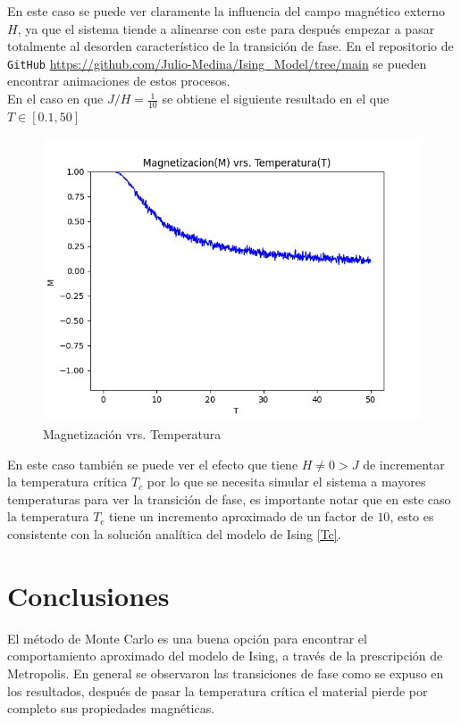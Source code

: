 \documentclass[a4paper]{article}
\begin{document}
En este caso se puede ver claramente la influencia del campo magnético externo $H$, ya que el sistema tiende a alinearse con este para después empezar a pasar totalmente al desorden característico de la transición de fase. En el repositorio de \texttt{GitHub} \url{https://github.com/Julio-Medina/Ising_Model/tree/main} se pueden encontrar animaciones de estos procesos.\\

En el caso en que $J/H=\frac{1}{10}$ se obtiene el siguiente resultado en el que $T\in[0.1,50]$ 
\begin{figure}[H]
\begin{center}
\includegraphics[scale=0.6]{PlotMvT_sim4.png} 
\end{center} 
\caption{Magnetización vrs. Temperatura}
\end{figure}
En este caso también se puede ver el efecto que tiene $H\neq0>J$ de incrementar la temperatura crítica $T_c$ por lo que se necesita simular el sistema a mayores temperaturas para ver la transición de fase, es importante notar que en este caso la temperatura $T_c$ tiene un incremento aproximado de un factor de $10$, esto es consistente con la solución analítica del modelo de Ising \ref{Tc}.



\section{Conclusiones}
El método de Monte Carlo es una buena opción para encontrar el comportamiento aproximado del modelo de Ising, a través de la prescripción de Metropolis. En general se observaron las transiciones de fase como se expuso en los resultados, después de pasar la temperatura crítica el material pierde por completo sus propiedades magnéticas.\\
\end{document}
